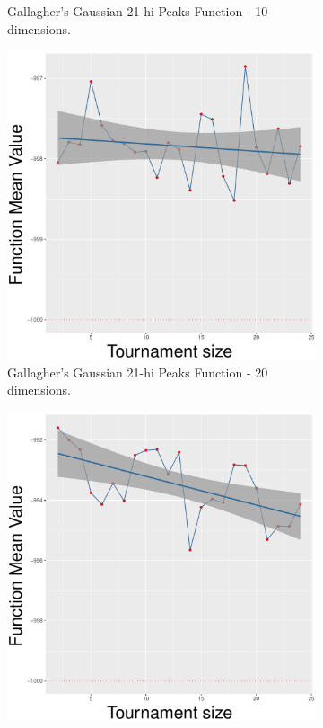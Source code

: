 \begin{figure}[!t]
\begin{subfigure}[b]{0.33\textwidth}
		\caption{Gallagher's Gaussian 21-hi Peaks Function - 10 dimensions.}
	\end{subfigure}
	\begin{subfigure}[b]{0.33\textwidth}
		\centering
		\includegraphics[width=\textwidth]{img/uniform-20D/multimodal_uniform_22_dim_20.pdf}
		\caption{Gallagher's Gaussian 21-hi Peaks Function - 20 dimensions.}
	\end{subfigure}
	\begin{subfigure}[b]{0.33\textwidth}
		\centering
		\includegraphics[width=\textwidth]{img/uniform-40D/multimodal_uniform_22_dim_40.pdf}

\end{subfigure}
\end{figure}
